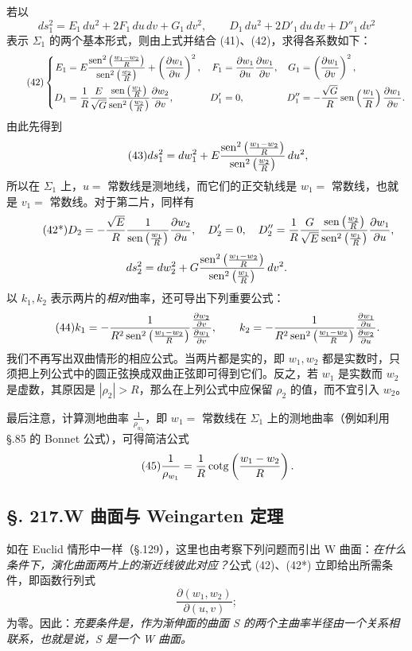 若以
\[
ds_1^2=E_1\,du^2+2F_1\,du\,dv+G_1\,dv^2,
\qquad
D_1\,du^2+2D'_1\,du\,dv+D''_1\,dv^2
\]
表示 $\Sigma_1$ 的两个基本形式，则由上式并结合 (41)、(42)，求得各系数如下：
\[
\tag{42}
\left\{
\begin{aligned}
E_1&=E\frac{\operatorname{sen}^2\left(\frac{w_1-w_2}{R}\right)}{\operatorname{sen}^2\left(\frac{w_2}{R}\right)}+\left(\frac{\partial w_1}{\partial u}\right)^2,
&F_1&=\frac{\partial w_1}{\partial u}\frac{\partial w_1}{\partial v},
&G_1&=\left(\frac{\partial w_1}{\partial v}\right)^2,\\
D_1&=\frac1R\frac{E}{\sqrt G}\frac{\operatorname{sen}\left(\frac{w_1}{R}\right)}{\operatorname{sen}^2\left(\frac{w_2}{R}\right)}\frac{\partial w_2}{\partial v},
&D'_1&=0,
&D''_1&=-\frac{\sqrt G}{R}\operatorname{sen}\left(\frac{w_1}{R}\right)\frac{\partial w_1}{\partial v}.
\end{aligned}\right.
\]
由此先得到
\[
\tag{43}
ds_1^2=dw_1^2+E\frac{\operatorname{sen}^2\left(\frac{w_1-w_2}{R}\right)}{\operatorname{sen}^2\left(\frac{w_2}{R}\right)}\,du^2,
\]
所以在 $\Sigma_1$ 上，$u=$ 常数线是测地线，而它们的正交轨线是 $w_1=$ 常数线，也就是 $v_1=$ 常数线。对于第二片，同样有
\[
\tag{42*}
D_2=-\frac{\sqrt E}{R}\frac1{\operatorname{sen}\left(\frac{w_1}{R}\right)}\frac{\partial w_2}{\partial u},\quad
D'_2=0,\quad
D''_2=\frac1R\frac{G}{\sqrt E}\frac{\operatorname{sen}\left(\frac{w_2}{R}\right)}{\operatorname{sen}^2\left(\frac{w_1}{R}\right)}\frac{\partial w_1}{\partial u},
\]
\[
ds_2^2=dw_2^2+G\frac{\operatorname{sen}^2\left(\frac{w_1-w_2}{R}\right)}{\operatorname{sen}^2\left(\frac{w_1}{R}\right)}\,dv^2.
\]
以 $k_1,k_2$ 表示两片的\emph{相对}曲率，还可导出下列重要公式：
\[
\tag{44}
k_1=-\frac{1}{R^2\operatorname{sen}^2\left(\frac{w_1-w_2}{R}\right)}\frac{\frac{\partial w_2}{\partial v}}{\frac{\partial w_1}{\partial v}},
\qquad
k_2=-\frac{1}{R^2\operatorname{sen}^2\left(\frac{w_1-w_2}{R}\right)}\frac{\frac{\partial w_1}{\partial u}}{\frac{\partial w_2}{\partial u}}.
\]
我们不再写出双曲情形的相应公式。当两片都是实的，即 $w_1,w_2$ 都是实数时，只须把上列公式中的圆正弦换成双曲正弦即可得到它们。反之，若 $w_1$ 是实数而 $w_2$ 是虚数，其原因是 $|\rho_2|>R$，那么在上列公式中应保留 $\rho_2$ 的值，而不宜引入 $w_2$。

最后注意，计算测地曲率 $\frac1{\rho_{w_1}}$，即 $w_1=$ 常数线在 $\Sigma_1$ 上的测地曲率（例如利用 \S.85 的 Bonnet 公式），可得简洁公式
\[
\tag{45}
\frac1{\rho_{w_1}}=\frac1R\operatorname{cotg}\left(\frac{w_1-w_2}{R}\right).
\]

\subsection*{\S. 217.\quad W 曲面与 Weingarten 定理}

如在 Euclid 情形中一样（\S.129），这里也由考察下列问题而引出 W 曲面：\emph{在什么条件下，演化曲面两片上的渐近线彼此对应？}公式 (42)、(42*) 立即给出所需条件，即函数行列式
\[
\frac{\partial(w_1,w_2)}{\partial(u,v)};
\]
为零。因此：\emph{充要条件是，作为渐伸面的曲面 S 的两个主曲率半径由一个关系相联系，也就是说，S 是一个 W 曲面。}

